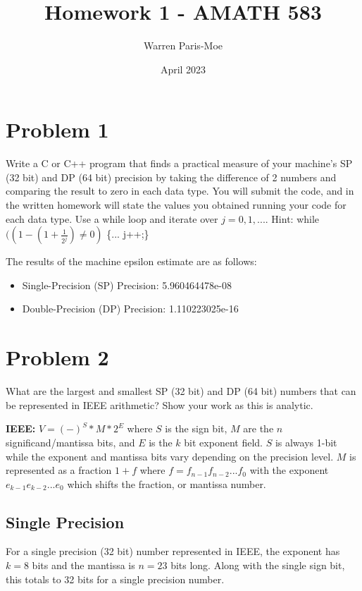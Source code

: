 \documentclass[12pt,letter]{article}
\title{Homework 1 - AMATH 583}
\author{Warren Paris-Moe}
\date{April 2023}
\begin{document}
\section{Problem 1}
\begin{mdframed}
Write a C or C++ program that finds a practical measure of your machine’s SP (32 bit) and DP (64 bit)
precision by taking the difference of 2 numbers and comparing the result to zero in each data type. You
will submit the code, and in the written homework will state the values you obtained running your code
for each data type. Use a while loop and iterate over $j = 0, 1,...$. 
Hint: while $((1-(1+\frac{1}{2^j})\neq0)$ \{... j++;\}
\end{mdframed}

The results of the machine epsilon estimate are as follows:
\begin{itemize}
    \item Single-Precision (SP) Precision: 5.960464478e-08
    \item Double-Precision (DP) Precision: 1.110223025e-16
\end{itemize}

\section{Problem 2}
\begin{mdframed}
What are the largest and smallest SP (32 bit) and DP (64 bit) numbers that can be represented in IEEE
arithmetic? Show your work as this is analytic.
\end{mdframed}

\textbf{IEEE:} $V = (-)^S * M * 2^E$ where $S$ is the sign bit, $M$ are the $n$ significand/mantissa bits, and $E$ is the $k$ bit exponent field. $S$ is always 1-bit while the exponent and mantissa bits vary depending on the precision level. $M$ is represented as a fraction $1+f$ where $f=f_{n-1}f_{n-2}...f_0$ with the exponent $e_{k-1}e_{k-2}...e_0$ which shifts the fraction, or mantissa number.

\subsection{Single Precision}
For a single precision (32 bit) number represented in IEEE, the exponent has $k=8$ bits and the mantissa is $n=23$ bits long. Along with the single sign bit, this totals to 32 bits for a single precision number. \\
\end{document}
